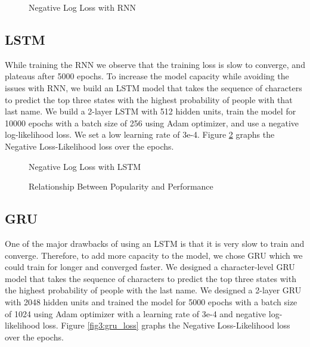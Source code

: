 \documentclass[11pt,  letterpaper]{article}
\begin{document}
\begin{figure}[!htb]
  \centering
    \caption{Negative Log Loss with RNN}
  \label{fig1:rnn_loss}
\end{figure}

\subsection{LSTM}

While training the RNN we observe that the training loss is slow to converge, and plateaus after 5000 epochs. To increase the model capacity while avoiding the issues with RNN, we build an LSTM model that takes the sequence of characters to predict the top three states with the highest probability of people with that last name. We build a 2-layer LSTM with 512 hidden units, train the model for 10000 epochs with a batch size of 256 using Adam optimizer, and use a negative log-likelihood loss. We set a low learning rate of 3e-4. Figure \ref{fig2:lstm_loss} graphs the Negative Loss-Likelihood loss over the epochs.

\begin{figure}[!htb]
  \centering
    \caption{Negative Log Loss with LSTM}

  \label{fig2:lstm_loss}
\end{figure}

\begin{figure}[!htb]
  \centering
    \caption{Relationship Between Popularity and Performance}
  \label{fig:lstm_loss}
\end{figure}

\subsection{GRU}

One of the major drawbacks of using an LSTM is that it is very slow to train and converge. Therefore, to add more capacity to the model, we chose GRU which we could train for longer and converged faster. We designed a character-level GRU model that takes the sequence of characters to predict the top three states with the highest probability of people with the last name. We designed a 2-layer GRU with 2048 hidden units and trained the model for 5000 epochs with a batch size of 1024 using Adam optimizer with a learning rate of 3e-4 and negative log-likelihood loss. Figure \ref{fig3:gru_loss} graphs the Negative Loss-Likelihood loss over the epochs.
\end{document}
